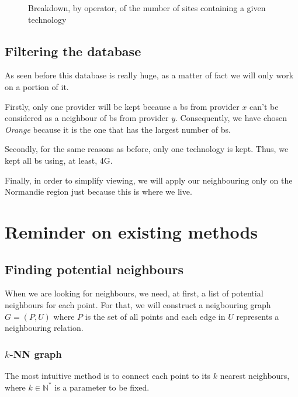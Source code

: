 \documentclass[lettersize,journal,english]{IEEEtran}
\begin{document}
\begin{figure}[!b]
    \centering
    \caption{Breakdown, by operator, of the number of sites containing a given technology}
    \label{fig:data_technos}
\end{figure}

\subsection{Filtering the database}
As seen before this database is really huge, as a matter of fact we will only work on a portion of it.

Firstly, only one provider will be kept because a \acrshort{bs} from provider $x$ can't be considered as a neighbour of \acrshort{bs} from provider $y$.
Consequently, we have chosen \emph{Orange} because it is the one that has the largest number of \acrshort{bs}.

Secondly, for the same reasons as before, only one technology is kept. Thus, we kept all \acrshort{bs} using, at least, 4G.

Finally, in order to simplify viewing, we will apply our neighbouring only on the Normandie region just because this is where we live.
\section{Reminder on existing methods\label{sec:reminder}}
\subsection{Finding potential neighbours}
When we are looking for neighbours, we need, at first, a list of potential neighbours for each point.
For that, we will construct a neigbouring graph $G = (P, U)$ where $P$ is the set of all points and each edge in $U$ represents a neighbouring relation.

\subsubsection{$k$-NN graph}
The most intuitive method is to connect each point to its $k$ nearest neighbours, where $k \in \mathbb{N}^*$ is a parameter to be fixed. 
\end{document}
